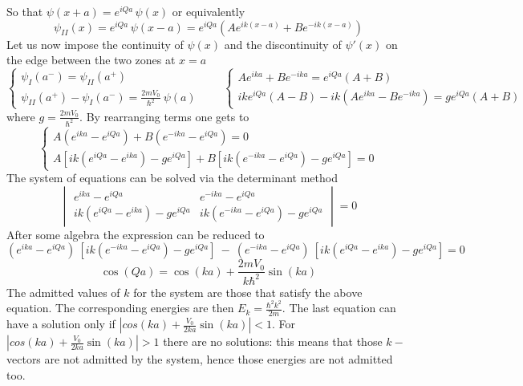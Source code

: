 \documentclass{article}
\begin{document}
So that 
$\psi(x+a) = e^{iQa} \, \psi(x)$ 
or equivalently 
\begin{equation}
    \psi_{II}(x) = e^{iQa} \, \psi(x-a) = e^{iQa} \left(Ae^{ik(x-a)} + Be^{-ik(x-a)}\right)
\end{equation}
Let us now impose the continuity of $\psi(x)$ and the discontinuity of $\psi'(x)$ on the edge between the two zones at $x=a$
$$\begin{cases}
    \psi_I(a^-) = \psi_{II}(a^+) \\
    \psi_{II}(a^+) - \psi_{I}(a^-) = \frac{2mV_0}{\hbar^2} \ \psi(a)
\end{cases}
\qquad
\begin{cases}
    Ae^{ika} + Be^{-ika} = e^{iQa} (A+B) \\
    ike^{iQa}(A-B) - ik(Ae^{ika} - Be^{-ika}) = ge^{iQa} (A+B)
\end{cases}
$$
where $g=\frac{2mV_0}{\hbar^2}$. By rearranging terms one gets to 
$$\begin{cases}
    A(e^{ika} - e^{iQa}) + B(e^{-ika} - e^{iQa}) = 0 \\
    A[ik(e^{iQa} - e^{ika}) - ge^{iQa}] + B[ik(e^{-ika} - e^{iQa}) - ge^{iQa}] = 0
\end{cases}$$
The system of equations can be solved via the determinant method 
\begin{equation*}
    \begin{vmatrix} e^{ika} - e^{iQa} & e^{-ika} - e^{iQa} \\ ik(e^{iQa} - e^{ika}) - ge^{iQa} & ik(e^{-ika} - e^{iQa}) - ge^{iQa} \end{vmatrix} = 0
\end{equation*} 
After some algebra the expression can be reduced to
\begin{equation*}
    (e^{ika} - e^{iQa}) \ [ik(e^{-ika} - e^{iQa}) - ge^{iQa}] \ - \ (e^{-ika}-e^{iQa}) \ [ik(e^{iQa}-e^{ika})-ge^{iQa}] = 0
\end{equation*}
\begin{equation}
    \cos(Qa) = \cos(ka) + \frac{2mV_0}{k\hbar^2} \sin(ka)
    \label{eq:trascendent_equation}
\end{equation}
The admitted values of $k$ for the system are those that satisfy the above equation. The corresponding energies are then $E_k = \frac{\hbar^2k^2}{2m}$.
The last equation can have a solution only if $|cos(ka) + \frac{V_0}{2ka} \sin(ka)| < 1$. 
For $|cos(ka) + \frac{V_0}{2ka} \sin(ka)| > 1$ there are no solutions: this means that those $k-$vectors are not admitted by the system, hence those energies are not admitted too.
\end{document}
